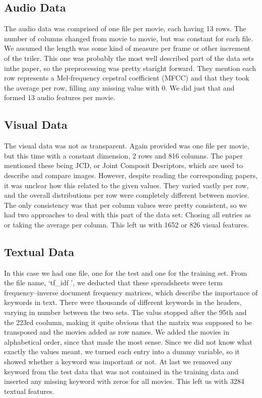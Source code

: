 \documentclass[sigconf]{acmart}
\begin{document}
\subsection{Audio Data}
The audio data was comprised of one file per movie, each having 13 rows. The number of columns changed from movie to movie, but was constant for each file. We assumed the length was some kind of measure per frame or other increment of the triler. This one was probably the most well described part of the data sets inthe paper, so the preprocessing was pretty staright forward. They mention each row represents a Mel-frequency cepstral coefficient (MFCC) and that they took the average per row, filling any missing value with 0. We did just that and formed 13 audio features per movie.

\subsection{Visual Data}
The visual data was not as transparent. Again provided was one file per movie, but this time with a constant dimension, 2 rows and 816 columns. The paper mentioned these being JCD, or Joint Composit Desriptors, which are used to describe and compare images. However, despite reading the corresponding papers, it was unclear how this related to the given values. They varied vastly per row, and the overall distributions per row were completely different between movies. The only consistency was that per column values were pretty consistent, so we had two approaches to deal with this part of the data set: Chosing all entries as or taking the average per column. This left us with 1652 or 826 visual features.

\subsection{Textual Data}
In this case we had one file, one for the test and one for the training set. From the file name, \lq tf\_idf \rq, we deducted that these spreadsheets were term frequency–inverse document frequency matrices, which describe the importance of keywords in text. There were thousands of different keywords in the headers, varying in number between the two sets. The valus stopped after the 95th and the 223rd coolumn, making it quite obvious that the matrix was supposed to be transposed and the movies added as row names. We added the movies in alphabetical order, since that made the most sense. Since we did not know what exactly the values meant, we turned each entry into a dummy variable, so it showed whether a keyword was important or not. At last we removed any keyword from the test data that was not contained in the training data and inserted any missing keyword with zeros for all movies. This left us with 3284 textual features.
\end{document}
